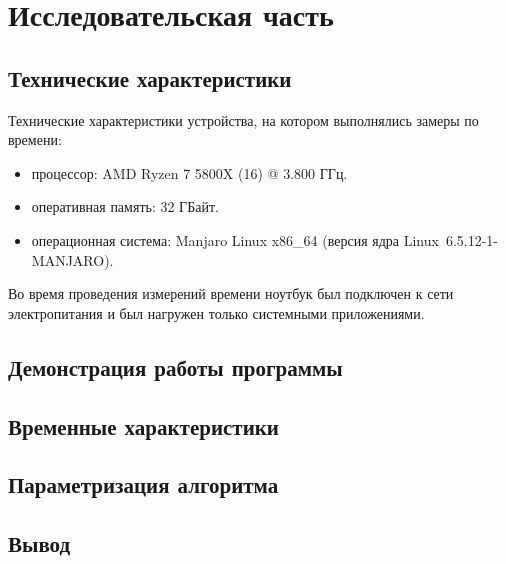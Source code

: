 \chapter{Исследовательская часть}

\section{Технические характеристики}

Технические характеристики устройства, на котором выполнялись замеры по времени:

\begin{itemize}
	\item процессор: AMD Ryzen 7 5800X (16) @ 3.800 ГГц.
	\item оперативная память: 32 ГБайт.
	\item операционная система: Manjaro Linux x86\_64 (версия ядра Linux~6.5.12-1-MANJARO).
\end{itemize}

Во время проведения измерений времени ноутбук был подключен к сети электропитания и был нагружен только системными приложениями.


\section{Демонстрация работы программы}

\section{Временные характеристики}

\section{Параметризация алгоритма}

\section*{Вывод}
